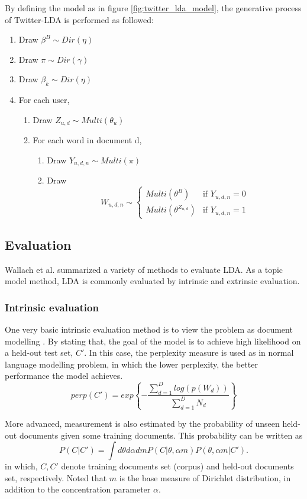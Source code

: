 \documentclass[11pt]{article}
\begin{document}
By defining the model as in figure \ref{fig:twitter_lda_model}, the generative process of Twitter-LDA is performed as followed:
\begin{enumerate}
	\item Draw $\beta^B \sim Dir(\eta)$
	\item Draw $\pi \sim Dir(\gamma)$
	\item Draw $\beta_k \sim Dir(\eta)$
	\item For each user,
	\begin{enumerate}
		\item Draw $Z_{u,d} \sim Multi(\theta_u)$
		\item For each word in document d,
		\begin{enumerate}
			\item Draw $Y_{u,d,n} \sim Multi(\pi)$
			\item Draw \[W_{u,d,n} \sim 
			\begin{cases}
			Multi(\theta^B) & \text{if $Y_{u,d,n} = 0$}\\
			Multi(\theta^{Z_{u,d}}) & \text{if $Y_{u,d,n} = 1$}
			\end{cases}\]
		\end{enumerate}
	\end{enumerate}
\end{enumerate}

\subsection{Evaluation} \label{evaluation}

Wallach et al. \cite{Wallach2009a} summarized a variety of methods to evaluate LDA. As a topic model method, LDA is commonly evaluated by intrinsic and extrinsic evaluation. 

\subsubsection{Intrinsic evaluation}
One very basic intrinsic evaluation method is to view the problem as document modelling \cite{Blei2003}. By stating that, the goal of the model is to achieve high likelihood on a held-out test set, $C'$. In this case, the perplexity measure is used as in normal language modelling problem, in which the lower perplexity, the better performance the model achieves.
\[perp(C')=exp\left\{-\frac{\sum_{d=1}^{D}{log(p(W_d))}}{\sum_{d=1}^{D}N_d}\right\}\]

More advanced, measurement is also estimated by the probability of unseen held-out documents given some training documents. This probability can be written as \cite{Wallach2009a}
\[P(C|C')=\int d\theta d\alpha dm P(C|\theta,\alpha m)P(\theta,\alpha m|C').\]
in which, $C, C'$ denote training documents set (corpus) and held-out documents set, respectively. Noted that $m$ is the base measure of Dirichlet distribution, in addition to the concentration parameter $\alpha$.
\end{document}

